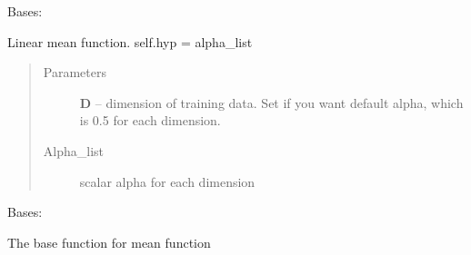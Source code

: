 \documentclass[letterpaper,10pt,english]{sphinxmanual}
\begin{document}
\begin{fulllineitems}
\label{pyGPs.Core:pyGPs.Core.mean.Linear}
Bases: 

Linear mean function. self.hyp = alpha\_list
\begin{quote}\begin{description}
\item[{Parameters}] \leavevmode
\textbf{D} -- dimension of training data. Set if you want default alpha, which is 0.5 for each dimension.

\item[{Alpha\_list }] \leavevmode
scalar alpha for each dimension

\end{description}\end{quote}

\begin{fulllineitems}
\label{pyGPs.Core:pyGPs.Core.mean.Linear.getDerMatrix}
\end{fulllineitems}


\begin{fulllineitems}
\label{pyGPs.Core:pyGPs.Core.mean.Linear.getMean}
\end{fulllineitems}


\end{fulllineitems}


\begin{fulllineitems}
\label{pyGPs.Core:pyGPs.Core.mean.Mean}
Bases: 

The base function for mean function

\end{fulllineitems}

\end{document}
